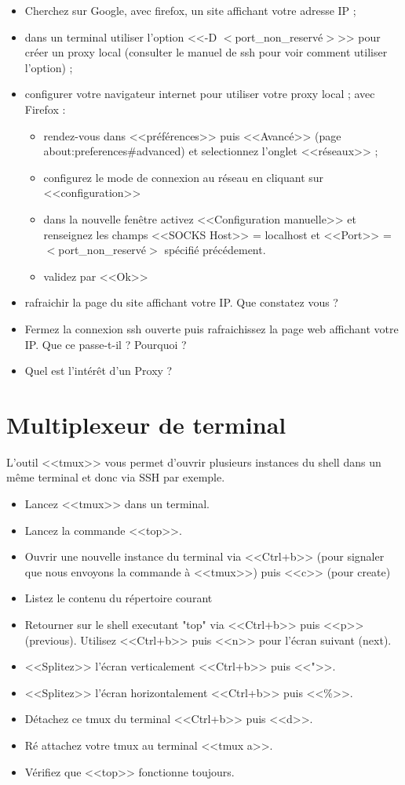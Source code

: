 \documentclass[11pt]{article}
\begin{document}
\begin{itemize}
 \item Cherchez sur Google, avec firefox, un site affichant votre adresse IP ;
 \item dans un terminal utiliser l'option <<-D $<$port\_non\_reservé$>$>> pour créer un proxy local (consulter le manuel de ssh pour voir comment utiliser l'option) ;
 \item configurer votre navigateur internet pour utiliser votre proxy local ; avec Firefox :
 \begin{itemize}
  \item rendez-vous dans <<préférences>> puis <<Avancé>> (page about:preferences\#advanced) et selectionnez l'onglet <<réseaux>> ;
  \item configurez le mode de connexion au réseau en cliquant sur <<configuration>>
  \item dans la nouvelle fenêtre activez <<Configuration manuelle>> et renseignez les champs <<SOCKS Host>> = localhost et <<Port>> = $<$port\_non\_reservé$>$ spécifié précédement.
  \item validez par <<Ok>>
 \end{itemize}
 \item rafraichir la page du site affichant votre IP. Que constatez vous ?
 \item Fermez la connexion ssh ouverte puis rafraichissez la page web affichant votre IP. Que ce passe-t-il ? Pourquoi ?
 \item Quel est l'intérêt d'un Proxy ?
\end{itemize}

\section{Multiplexeur de terminal}

L'outil <<tmux>> vous permet d'ouvrir plusieurs instances du shell dans un même terminal et donc via SSH par exemple.

\begin{itemize}
 \item Lancez <<tmux>> dans un terminal.
 \item Lancez la commande <<top>>.
 \item Ouvrir une nouvelle instance du terminal via <<Ctrl+b>> (pour signaler que nous envoyons la commande à <<tmux>>) puis <<c>> (pour create)
 \item Listez le contenu du répertoire courant
 \item Retourner sur le shell executant "top" via <<Ctrl+b>> puis <<p>> (previous). Utilisez <<Ctrl+b>> puis <<n>> pour l'écran suivant (next).
 \item <<Splitez>> l'écran verticalement <<Ctrl+b>> puis <<">>.
 \item <<Splitez>> l'écran horizontalement <<Ctrl+b>> puis <<\%>>.
 \item Détachez ce tmux du terminal <<Ctrl+b>> puis <<d>>.
 \item Ré attachez votre tmux au terminal <<tmux a>>.
 \item Vérifiez que <<top>> fonctionne toujours.
\end{itemize}
\end{document}
